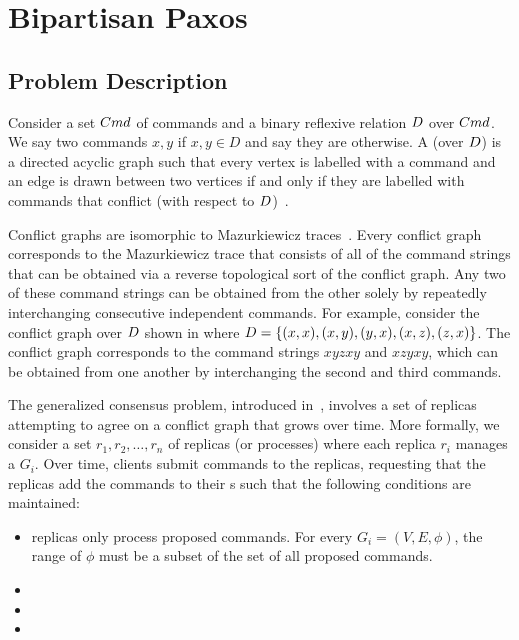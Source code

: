 \section{Bipartisan Paxos}

\subsection{Problem Description}
{}

Consider a set $Cmd$ of commands and a binary reflexive relation $D$
over $Cmd$. We say two commands $x, y$  if $x, y \in D$ and
say they are  otherwise. A  (over
$D$) is a directed acyclic graph such that every vertex is labelled
with a command and an edge is drawn between two vertices if and only if they
are labelled with commands that conflict (with respect to
$D$)~\cite{mazurkiewicz1995introduction}.

Conflict graphs are isomorphic to Mazurkiewicz
traces~\cite{mazurkiewicz1985semantics, mazurkiewicz1995introduction}. Every
conflict graph corresponds to the Mazurkiewicz trace that consists of all of
the command strings that can be obtained via a reverse topological sort of the
conflict graph. Any two of these command strings can be obtained from the other
solely by repeatedly interchanging consecutive independent commands. For
example, consider the conflict graph over $D$ shown in
 where
  $D = \{(x, x), (x, y), (y, x), (x, z), (z, x)\}$.
The conflict graph corresponds to the command strings $xyzxy$ and $xzyxy$,
which can be obtained from one another by interchanging the second and third
commands.

The generalized consensus problem, introduced in~\cite{lamport1998part},
involves a set of replicas attempting to agree on a conflict graph that grows
over time. More formally, we consider a set $r_1, r_2, \ldots, r_n$ of replicas
(or processes) where each replica $r_i$ manages a \conflictgraph{} $G_i$. Over
time, clients submit commands to the replicas, requesting that the replicas add
the commands to their \conflictgraph{}s such that the following conditions are
maintained:
\begin{itemize}
  \item {}
    replicas only process proposed commands. For every \conflictgraph{} $G_i =
    (V, E, \phi)$, the range of $\phi$ must be a subset of the set of all
    proposed commands.

  \item {}
  \item {}
  \item {}
\end{itemize}


